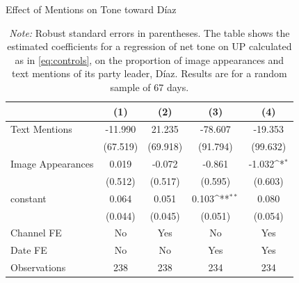 \documentclass[12pt]{article}
\begin{document}
	
	\begin{table}[!htb]\centering
		\def\sym#1{\ifmmode^{#1}\else\(^{#1}\)\fi}
		\caption{Effect of Mentions on Tone toward Díaz}
		\begin{tabular}{l*{4}{c}}
			\hline\hline
			&\multicolumn{1}{c}{(1)}         &\multicolumn{1}{c}{(2)}         &\multicolumn{1}{c}{(3)}         &\multicolumn{1}{c}{(4)}         \\
			\hline
			Text Mentions   &  -11.990         &   21.235         &  -78.607         &  -19.353         \\
			& (67.519)         & (69.918)         & (91.794)         & (99.632)         \\
			Image Appearances  &    0.019         &   -0.072         &   -0.861         &   -1.032\sym{*}  \\
			&  (0.512)         &  (0.517)         &  (0.595)         &  (0.603)         \\
			constant          &    0.064         &    0.051         &    0.103\sym{**} &    0.080         \\
			&  (0.044)         &  (0.045)         &  (0.051)         &  (0.054)         \\
			Channel FE      &       No         &      Yes         &       No         &      Yes         \\
			Date FE         &       No         &       No         &      Yes         &      Yes         \\
			\hline
			Observations    &      238         &      238         &      234         &      234         \\
			\hline\hline
		\end{tabular}
		\label{tab:diaz_images}
		\vspace{0.5em}
		\caption*{\scriptsize\emph{Note:} Robust standard errors in parentheses. The table shows the estimated coefficients for a regression of net tone on UP calculated as in \ref{eq:controls}, on the proportion of image appearances and text mentions of its party leader, Díaz. Results are for a random sample of 67 days. }
	\end{table}
	
	
	
	
	
	
	
\end{document}
